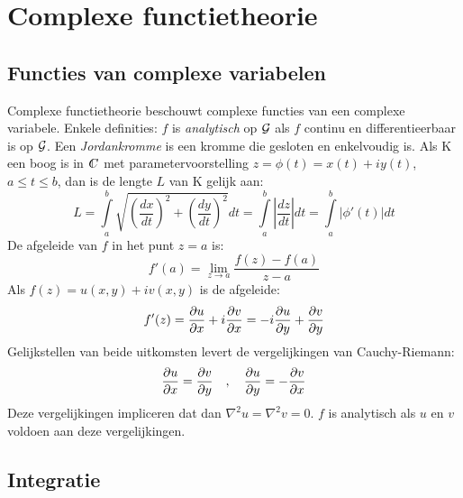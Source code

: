 \chapter{Complexe functietheorie}
\section{Functies van complexe variabelen}
Complexe functietheorie beschouwt complexe functies van een complexe variabele.
Enkele definities:
\npar
$f$ is {\it analytisch} op $\cal G$ als $f$ continu en differentieerbaar is
op $\cal G$.
\npar
Een {\it Jordankromme} is een kromme die gesloten en enkelvoudig is.
\npar
Als K een boog is in $\CC$ met parametervoorstelling $z=\phi(t)=x(t)+iy(t)$,
$a\leq t\leq b$, dan is de lengte $L$ van K gelijk aan:
\[
L=\int\limits_a^b \sqrt{\left(\frac{dx}{dt}\right)^2+\left(\frac{dy}{dt}\right)^2}dt=
\int\limits_a^b\left|\frac{dz}{dt}\right|dt=\int\limits_a^b|\phi'(t)|dt
\]
De afgeleide van $f$ in het punt $z=a$ is:
\[
f'(a)=\lim_{z\rightarrow a}\frac{f(z)-f(a)}{z-a}
\]
Als $f(z)=u(x,y)+iv(x,y)$ is de afgeleide:
\[
f'(z)=\frac{\partial u}{\partial x}+i\frac{\partial v}{\partial x}=-i\frac{\partial u}{\partial y}+\frac{\partial v}{\partial y}
\]
Gelijkstellen van beide uitkomsten levert de vergelijkingen van Cauchy-Riemann:
\[
\frac{\partial u}{\partial x}=\frac{\partial v}{\partial y}~~~,~~~\frac{\partial u}{\partial y}=-\frac{\partial v}{\partial x}
\]
Deze vergelijkingen impliceren dat dan $\nabla^2u=\nabla^2v=0$.
$f$ is analytisch als $u$ en $v$ voldoen aan deze vergelijkingen.

\section{Integratie}
